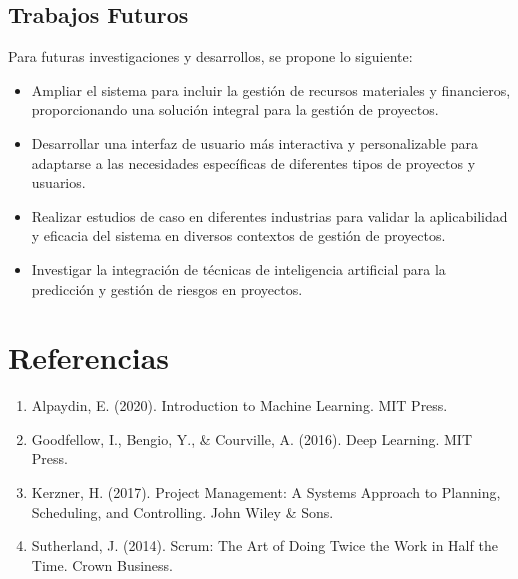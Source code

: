 \documentclass{article}
\begin{document}
    \subsection{Trabajos Futuros}
        Para futuras investigaciones y desarrollos, se propone lo siguiente:
        \begin{itemize}
            \item Ampliar el sistema para incluir la gestión de recursos materiales y financieros, proporcionando una solución integral para la gestión de proyectos.
            \item Desarrollar una interfaz de usuario más interactiva y personalizable para adaptarse a las necesidades específicas de diferentes tipos de proyectos y usuarios.
            \item Realizar estudios de caso en diferentes industrias para validar la aplicabilidad y eficacia del sistema en diversos contextos de gestión de proyectos.
            \item Investigar la integración de técnicas de inteligencia artificial para la predicción y gestión de riesgos en proyectos.
        \end{itemize}

    \section{Referencias}
    \begin{enumerate}
        \item Alpaydin, E. (2020). Introduction to Machine Learning. MIT Press.
        \item Goodfellow, I., Bengio, Y., \& Courville, A. (2016). Deep Learning. MIT Press.
        \item Kerzner, H. (2017). Project Management: A Systems Approach to Planning, Scheduling, and Controlling. John Wiley \& Sons.
        \item Sutherland, J. (2014). Scrum: The Art of Doing Twice the Work in Half the Time. Crown Business.
    \end{enumerate}

    
\end{document}
